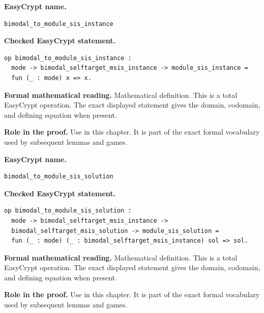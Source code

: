 \begin{formaldefinition}
\noindent\textbf{EasyCrypt name.}
\begin{lstlisting}[language=EasyCrypt,basicstyle=\ttfamily\scriptsize]
bimodal_to_module_sis_instance
\end{lstlisting}
\noindent\textbf{Checked EasyCrypt statement.}
\begin{lstlisting}[language=EasyCrypt,basicstyle=\ttfamily\scriptsize]
op bimodal_to_module_sis_instance :
  mode -> bimodal_selftarget_msis_instance -> module_sis_instance =
  fun (_ : mode) x => x.
\end{lstlisting}
\noindent\textbf{Formal mathematical reading.}
Mathematical definition. This is a total EasyCrypt operation.  The exact displayed statement gives the domain, codomain, and defining equation when present.

\noindent\textbf{Role in the proof.}
Use in this chapter. It is part of the exact formal vocabulary used by subsequent lemmas and games.

\end{formaldefinition}

\begin{formaldefinition}
\noindent\textbf{EasyCrypt name.}
\begin{lstlisting}[language=EasyCrypt,basicstyle=\ttfamily\scriptsize]
bimodal_to_module_sis_solution
\end{lstlisting}
\noindent\textbf{Checked EasyCrypt statement.}
\begin{lstlisting}[language=EasyCrypt,basicstyle=\ttfamily\scriptsize]
op bimodal_to_module_sis_solution :
  mode -> bimodal_selftarget_msis_instance ->
  bimodal_selftarget_msis_solution -> module_sis_solution =
  fun (_ : mode) (_ : bimodal_selftarget_msis_instance) sol => sol.
\end{lstlisting}
\noindent\textbf{Formal mathematical reading.}
Mathematical definition. This is a total EasyCrypt operation.  The exact displayed statement gives the domain, codomain, and defining equation when present.

\noindent\textbf{Role in the proof.}
Use in this chapter. It is part of the exact formal vocabulary used by subsequent lemmas and games.

\end{formaldefinition}

